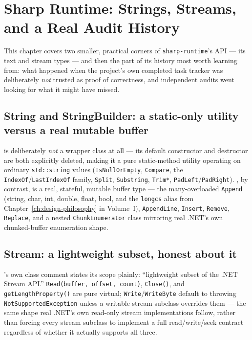 \chapter{Sharp Runtime: Strings, Streams, and a Real Audit History}
\label{ch:sharp-runtime-namespaces}

This chapter covers two smaller, practical corners of \texttt{sharp-runtime}'s API --- its
text and stream types --- and then the part of its history most worth learning from: what
happened when the project's own completed task tracker was deliberately \emph{not} trusted as
proof of correctness, and independent audits went looking for what it might have missed.

\section{String and StringBuilder: a static-only utility versus a real mutable buffer}

 is deliberately \emph{not} a wrapper class at all --- its default
constructor and destructor are both explicitly deleted, making it a pure static-method utility
operating on ordinary \texttt{std::string} values (\texttt{IsNullOrEmpty}, \texttt{Compare},
the \texttt{IndexOf}/\texttt{LastIndexOf} family, \texttt{Split}, \texttt{Substring},
\texttt{Trim*}, \texttt{PadLeft}/\texttt{PadRight}). , by
contrast, is a real, stateful, mutable buffer type --- the many-overloaded \texttt{Append}
(string, char, int, double, float, bool, and the \texttt{longcs} alias from
Chapter~\ref{ch:design-philosophy} in Volume~I), \texttt{AppendLine}, \texttt{Insert},
\texttt{Remove}, \texttt{Replace}, and a nested \texttt{ChunkEnumerator} class mirroring real
.NET's own chunked-buffer enumeration shape.

\section{Stream: a lightweight subset, honest about it}

's own class comment states its scope plainly: ``lightweight subset of
the .NET Stream API.'' \texttt{Read(buffer, offset, count)}, \texttt{Close()}, and
\texttt{getLengthProperty()} are pure virtual; \texttt{Write}/\texttt{WriteByte} default to
throwing \texttt{NotSupportedException} unless a writable stream subclass overrides them ---
the same shape real .NET's own read-only stream implementations follow, rather than forcing
every stream subclass to implement a full read/write/seek contract regardless of whether it
actually supports all three.

